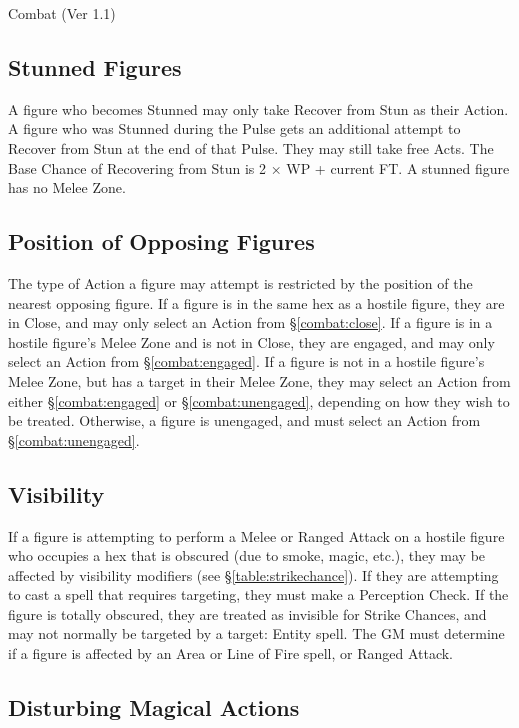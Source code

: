 \begin{Chapter}{Combat (Ver 1.1)}
\subsection{Stunned Figures}

A figure who becomes Stunned may only take Recover from Stun as their
Action.  A figure who was Stunned during the Pulse gets an additional
attempt to Recover from Stun at the end of that Pulse.  They may still
take free Acts.  The Base Chance of Recovering from Stun is 2 × WP +
current FT.  A stunned figure has no Melee Zone.

\subsection{Position of Opposing Figures}

The type of Action a figure may attempt is restricted by the position
of the nearest opposing figure.  If a figure is in the same hex as a
hostile figure, they are in Close, and may only select an Action from
\S\ref{combat:close}.  If a figure is in a hostile figure’s Melee Zone
and is not in Close, they are engaged, and may only select an Action
from \S\ref{combat:engaged}.  If a figure is not in a hostile figure’s
Melee Zone, but has a target in their Melee Zone, they may select an
Action from either \S\ref{combat:engaged} or \S\ref{combat:unengaged},
depending on how they wish to be treated.  Otherwise, a figure is
unengaged, and must select an Action from \S\ref{combat:unengaged}.

\subsection{Visibility}

If a figure is attempting to perform a Melee or Ranged Attack on a
hostile figure who occupies a hex that is obscured (due to smoke,
magic, etc.), they may be affected by visibility modifiers (see
\S\ref{table:strikechance}).  If they are attempting to cast a spell
that requires targeting, they must make a Perception Check.  If the
figure is totally obscured, they are treated as invisible for Strike
Chances, and may not normally be targeted by a target: Entity spell.
The GM must determine if a figure is affected by an Area or Line of
Fire spell, or Ranged Attack.

\subsection{Disturbing Magical Actions}


\end{Chapter}
